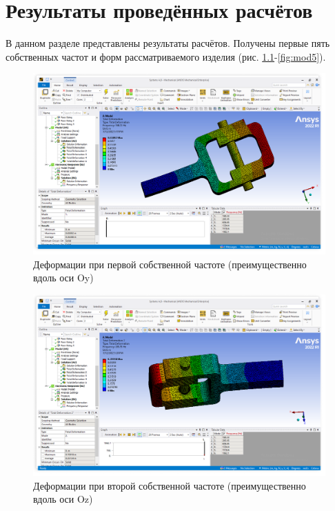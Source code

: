 \chapter{Результаты проведённых расчётов} \label{ch3}


В данном разделе представлены результаты расчётов. Получены первые пять собственных частот и форм рассматриваемого изделия (рис. \ref{fig:mod1}-\ref{fig:mod5}).

\begin{figure}[H] 
	\center
	\includegraphics[width=.9\textwidth]{images/mod1.png}
	\caption{Деформации при первой собственной частоте (преимущественно вдоль оси Oy)}
	\label{fig:mod1}
\end{figure}

\begin{figure}[H] 
	\center
	\includegraphics[width=.9\textwidth]{images/mod2.png}
	\caption{Деформации при второй собственной частоте (преимущественно вдоль оси Oz)}
	\label{fig:mod2}
\end{figure}

